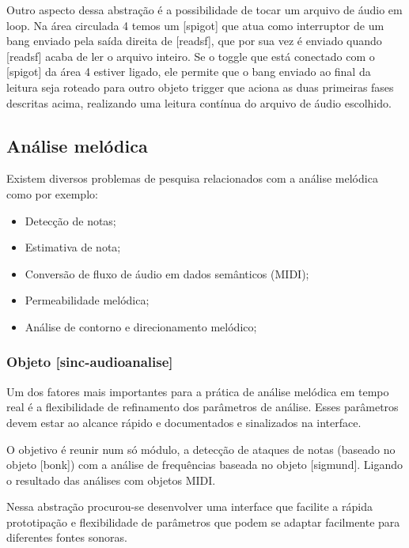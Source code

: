 \documentclass{ppgmus}
\begin{document}
Outro aspecto dessa abstração é a possibilidade de tocar um arquivo de áudio em loop.
Na área circulada 4 temos um [spigot] que atua como interruptor de um bang enviado pela
saída direita de [readsf\texttildelow], que por sua vez é enviado quando [readsf\texttildelow] 
acaba de ler o arquivo
inteiro. Se o toggle que está conectado com o [spigot] da área 4 estiver ligado, ele permite
que o bang enviado ao final da leitura seja roteado para outro objeto trigger que aciona as 
duas primeiras fases descritas acima, realizando uma leitura contínua do arquivo de áudio
escolhido.



\subsection{Análise melódica}


Existem diversos problemas de pesquisa relacionados com a
análise melódica como por exemplo:

\begin{itemize}
 \item Detecção de notas;
 \item Estimativa de nota;
 \item Conversão de fluxo de áudio em dados semânticos (MIDI);
 \item Permeabilidade melódica;
 \item Análise de contorno e direcionamento melódico;
\end{itemize}




\subsubsection{Objeto [sinc-audioanalise]}

Um dos fatores mais importantes para a prática de análise melódica
em tempo real é a flexibilidade de refinamento dos parâmetros
de análise. Esses parâmetros devem estar ao alcance rápido e documentados
e sinalizados na interface.

O objetivo é reunir num só módulo, a detecção de ataques de notas 
(baseado no objeto [bonk\texttildelow]) com a análise de frequências
baseada no objeto [sigmund\texttildelow]. Ligando o resultado das 
análises com objetos MIDI.

Nessa abstração procurou-se desenvolver uma interface que facilite
a rápida prototipação e flexibilidade de parâmetros que podem
se adaptar facilmente para diferentes fontes sonoras.
\end{document}
